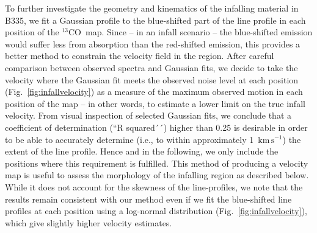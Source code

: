 \documentclass{aa}
\newcommand{\kmpers}{\ensuremath{\mathrm{km \, s^{-1}}}\xspace} %
\newcommand{\vlsr}{$\upsilon_{\rm LSR}$}              %
\newcommand{\trettenco}{$^{13}$CO\xspace}
\begin{document}
To further investigate the geometry and kinematics of the infalling material in B335, we fit a Gaussian profile to the blue-shifted part of the line profile in each position of the \trettenco\ map. Since -- in an infall scenario -- the blue-shifted emission would suffer less from absorption than the red-shifted emission, this provides a better method to constrain the velocity field in the region. After careful comparison between observed spectra and Gaussian fits, we decide to take the velocity where the Gaussian fit meets the observed noise level at each position (Fig.~\ref{fig:infallvelocity})  %
as a measure of the maximum observed motion in each position of the map -- in other words, to estimate a lower limit on the true infall velocity. From visual inspection of selected Gaussian fits, we conclude that a coefficient of determination (``R squared´´) higher than 0.25 is desirable in order to be able to accurately determine (i.e., to within approximately 1~\kmpers) the extent of the line profile. Hence and in the following, we only include the positions where this requirement is fulfilled. This method of producing a velocity map is useful to assess the morphology of the infalling region as described below. While it does not account for the skewness of the line-profiles, we note that the results remain consistent with our method even if we fit the blue-shifted line profiles at each position using a log-normal distribution (Fig.~\ref{fig:infallvelocity}), which give slightly higher velocity estimates. 

\end{document}
